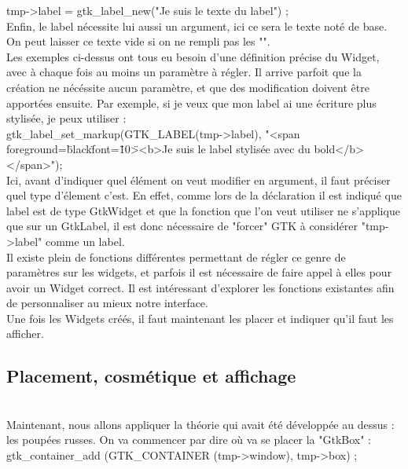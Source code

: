 \documentclass[11pt,french,a4paper]{report}
\begin{document}
tmp->label = gtk\_label\_new("Je suis le texte du label") ; \\
Enfin, le label nécessite lui aussi un argument, ici ce sera le texte noté de base. 
On peut laisser ce texte vide si on ne rempli pas les "".  \\


Les exemples ci-dessus ont tous eu besoin d'une définition précise du Widget, avec à chaque fois au moins un paramètre à régler. 
Il arrive parfoit que la création ne nécéssite aucun paramètre, et que des modification doivent être apportées ensuite. 
Par exemple, si je veux que mon label ai une écriture plus stylisée, je peux utiliser :  \\

gtk\_label\_set\_markup(GTK\_LABEL(tmp->label), "<span foreground=\"black\" font=\"10\"><b>Je suis le label stylisée avec du bold</b></span>"); \\

Ici, avant d'indiquer quel élément on veut modifier en argument, il faut préciser quel type d'élement c'est.
En effet, comme lors de la déclaration il est indiqué que label est de type GtkWidget et que la fonction que l'on veut utiliser 
ne s'applique que sur un GtkLabel, il est donc nécessaire de "forcer" GTK à considérer "tmp->label" comme un label.\\

Il existe plein de fonctions différentes permettant de régler ce genre de paramètres sur les widgets, et parfois il est nécessaire 
de faire appel à elles pour avoir un Widget correct. 
Il est intéressant d'explorer les fonctions existantes afin de personnaliser au mieux notre interface. \\

Une fois les Widgets créés, il faut maintenant les placer et indiquer qu'il faut les afficher. \\ 
 
\subsection{Placement, cosmétique et affichage} \\
Maintenant, nous allons appliquer la théorie qui avait été développée au dessus : les poupées russes. On va commencer par dire où 
va se placer la "GtkBox" : \\

 gtk\_container\_add (GTK\_CONTAINER (tmp->window), tmp->box) ; \\
\end{document}
